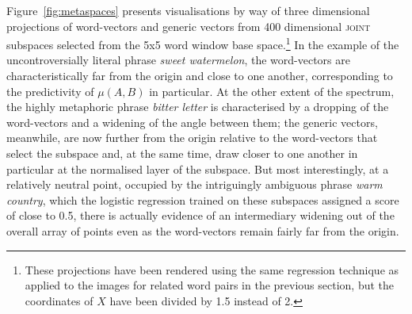 Figure~\ref{fig:metaspaces} presents visualisations by way of three dimensional projections of word-vectors and generic vectors from 400 dimensional \textsc{joint} subspaces selected from the 5x5 word window base space.\footnote{These projections have been rendered using the same regression technique as applied to the images for related word pairs in the previous section, but the coordinates of $X$ have been divided by 1.5 instead of 2.}  In the example of the uncontroversially literal phrase \emph{sweet watermelon}, the word-vectors are characteristically far from the origin and close to one another, corresponding to the predictivity of $\mu(A,B)$ in particular.  At the other extent of the spectrum, the highly metaphoric phrase \emph{bitter letter} is characterised by a dropping of the word-vectors and a widening of the angle between them; the generic vectors, meanwhile, are now further from the origin relative to the word-vectors that select the subspace and, at the same time, draw closer to one another in particular at the normalised layer of the subspace.  But most interestingly, at a relatively neutral point, occupied by the intriguingly ambiguous phrase \emph{warm country}, which the logistic regression trained on these subspaces assigned a score of close to 0.5, there is actually evidence of an intermediary widening out of the overall array of points even as the word-vectors remain fairly far from the origin.

